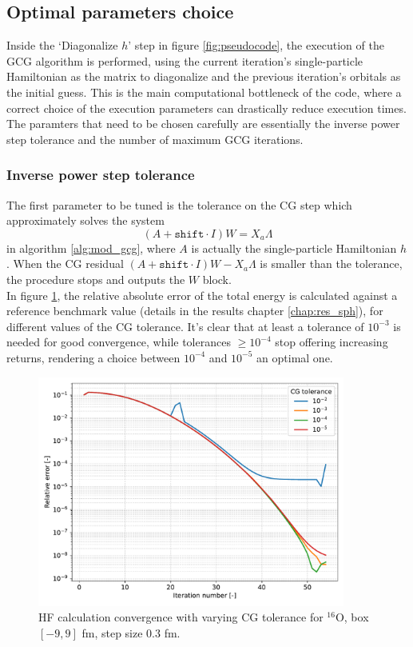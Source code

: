 \subsection{Optimal parameters choice}
Inside the `Diagonalize $h$' step in figure \ref{fig:pseudocode}, the execution of the GCG algorithm is performed, using the current iteration's single-particle Hamiltonian as the matrix to diagonalize and the previous iteration's orbitals as the initial guess. This is the main computational bottleneck of the code, where a correct choice of the execution parameters can drastically reduce execution times.
The paramters that need to be chosen carefully are essentially the inverse power step tolerance and the number of maximum GCG iterations.
\subsubsection{Inverse power step tolerance}
The first parameter to be tuned is the tolerance on the CG step which approximately solves the system \begin{equation}
    (A+ \texttt{shift}\cdot I)W = X_a\Lambda
\end{equation}
in algorithm \ref{alg:mod_gcg}, where $A$ is actually the single-particle Hamiltonian $h$.
When the CG residual $(A+ \texttt{shift}\cdot I)W -  X_a\Lambda$ is smaller than the tolerance, the procedure stops and outputs the $W$ block.
\\In figure \ref{fig:conv_tol}, the relative absolute error of the total energy is calculated against a reference benchmark value (details in the results chapter \ref{chap:res_sph}), for different values of the CG tolerance. It's clear that at least a tolerance of $10^{-3}$ is needed for good convergence, while tolerances $\ge 10^{-4}$ stop offering increasing returns, rendering a choice between $10^{-4}$ and $10^{-5}$ an optimal one.
\begin{figure}[h]
    \centering
    \includegraphics[width=0.9\textwidth]{Images/conv_tol.pdf}
    \caption{HF calculation convergence with varying CG tolerance for $^{16}$O, box $[-9, 9]$ fm, step size $0.3$ fm.} 
    \label{fig:conv_tol}
\end{figure}
